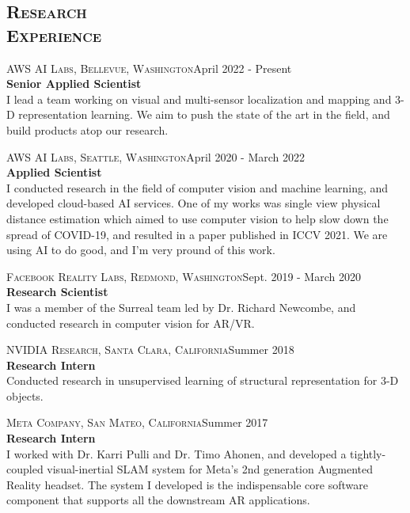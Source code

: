 \documentclass[margin, line, 10pt]{res} %
\begin{document}
\begin{resume}
\section{\textsc{Research\\Experience}}

\textsc{AWS AI Labs, Bellevue, Washington}\hfill April 2022 - Present \\
\textbf{Senior Applied Scientist}\\ 
I lead a team working on visual and multi-sensor localization and mapping and 3-D representation learning. We aim to push the state of the art in the field, and build products atop our research.

\textsc{AWS AI Labs, Seattle, Washington}\hfill April 2020 - March 2022 \\
\textbf{Applied Scientist}\\ 
I conducted research in the field of computer vision and machine learning, and developed cloud-based AI services. One of my works was single view physical distance estimation which aimed to use computer vision to help slow down the spread of COVID-19, and resulted in a paper published in ICCV 2021. We are using AI to do good, and I'm very pround of this work.

\textsc{Facebook Reality Labs, Redmond, Washington}\hfill Sept. 2019 - March 2020 \\
\textbf{Research Scientist}\\
I was a member of the Surreal team led by Dr. Richard Newcombe, and conducted research in computer vision for AR/VR.

\textsc{NVIDIA Research, Santa Clara, California}\hfill Summer 2018\\
\textbf{Research Intern}\\
Conducted research in unsupervised learning of structural representation for 3-D objects.

\textsc{Meta Company, San Mateo, California}\hfill Summer 2017\\
\textbf{Research Intern}\\
I worked with Dr. Karri Pulli and Dr. Timo Ahonen, and developed a tightly-coupled visual-inertial SLAM system for Meta's 2nd generation Augmented Reality headset. The system I developed is the indispensable core software component that supports all the downstream AR applications.



\end{resume}
\end{document}
